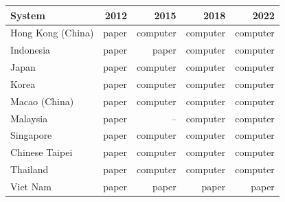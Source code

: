 \begin{tabular}{@{}lrrrr@{}}
\toprule
System & 2012 & 2015 & 2018 & 2022 \\
\midrule
Hong Kong (China) & paper & computer & computer & computer \\
Indonesia & paper & paper & computer & computer \\
Japan & paper & computer & computer & computer \\
Korea & paper & computer & computer & computer \\
Macao (China) & paper & computer & computer & computer \\
Malaysia & paper & -- & computer & computer \\
Singapore & paper & computer & computer & computer \\
Chinese Taipei & paper & computer & computer & computer \\
Thailand & paper & computer & computer & computer \\
Viet Nam & paper & paper & paper & paper \\
\bottomrule
\end{tabular}
